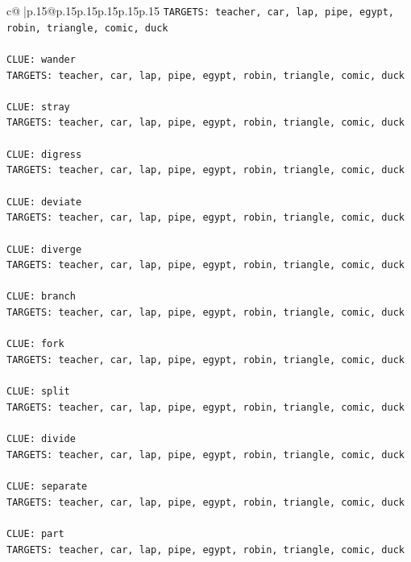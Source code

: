 \documentclass{article}
\begin{document}
{\begin{supertabular}{c@{$\;$}|p{.15\linewidth}@{}p{.15\linewidth}p{.15\linewidth}p{.15\linewidth}p{.15\linewidth}p{.15\linewidth}}
{{{\texttt{TARGETS: teacher, car, lap, pipe, egypt, robin, triangle, comic, duck} \\
\\ 
\texttt{CLUE: wander} \\
\texttt{TARGETS: teacher, car, lap, pipe, egypt, robin, triangle, comic, duck} \\
\\ 
\texttt{CLUE: stray} \\
\texttt{TARGETS: teacher, car, lap, pipe, egypt, robin, triangle, comic, duck} \\
\\ 
\texttt{CLUE: digress} \\
\texttt{TARGETS: teacher, car, lap, pipe, egypt, robin, triangle, comic, duck} \\
\\ 
\texttt{CLUE: deviate} \\
\texttt{TARGETS: teacher, car, lap, pipe, egypt, robin, triangle, comic, duck} \\
\\ 
\texttt{CLUE: diverge} \\
\texttt{TARGETS: teacher, car, lap, pipe, egypt, robin, triangle, comic, duck} \\
\\ 
\texttt{CLUE: branch} \\
\texttt{TARGETS: teacher, car, lap, pipe, egypt, robin, triangle, comic, duck} \\
\\ 
\texttt{CLUE: fork} \\
\texttt{TARGETS: teacher, car, lap, pipe, egypt, robin, triangle, comic, duck} \\
\\ 
\texttt{CLUE: split} \\
\texttt{TARGETS: teacher, car, lap, pipe, egypt, robin, triangle, comic, duck} \\
\\ 
\texttt{CLUE: divide} \\
\texttt{TARGETS: teacher, car, lap, pipe, egypt, robin, triangle, comic, duck} \\
\\ 
\texttt{CLUE: separate} \\
\texttt{TARGETS: teacher, car, lap, pipe, egypt, robin, triangle, comic, duck} \\
\\ 
\texttt{CLUE: part} \\
\texttt{TARGETS: teacher, car, lap, pipe, egypt, robin, triangle, comic, duck} \\
}}}
\end{supertabular}}
\end{document}
